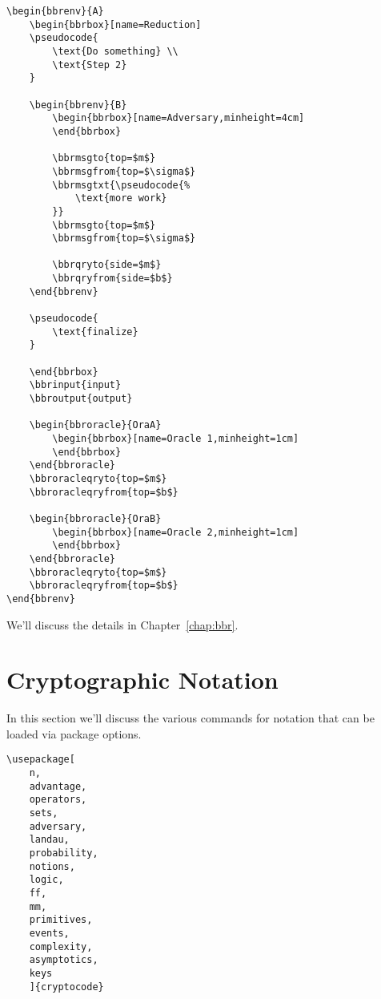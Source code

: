\documentclass[a4paper]{report}
\begin{document}
\begin{lstlisting}
\begin{bbrenv}{A}
	\begin{bbrbox}[name=Reduction]
	\pseudocode{
		\text{Do something} \\
		\text{Step 2}
	}

	\begin{bbrenv}{B}
		\begin{bbrbox}[name=Adversary,minheight=4cm]
		\end{bbrbox}

		\bbrmsgto{top=$m$}
		\bbrmsgfrom{top=$\sigma$}
		\bbrmsgtxt{\pseudocode{%
			\text{more work}
		}}
		\bbrmsgto{top=$m$}
		\bbrmsgfrom{top=$\sigma$}

		\bbrqryto{side=$m$}
		\bbrqryfrom{side=$b$}
	\end{bbrenv}

	\pseudocode{
		\text{finalize}
	}

	\end{bbrbox}
	\bbrinput{input}
	\bbroutput{output}

	\begin{bbroracle}{OraA}
		\begin{bbrbox}[name=Oracle 1,minheight=1cm]
		\end{bbrbox}
	\end{bbroracle}
	\bbroracleqryto{top=$m$}
	\bbroracleqryfrom{top=$b$}

	\begin{bbroracle}{OraB}
		\begin{bbrbox}[name=Oracle 2,minheight=1cm]
		\end{bbrbox}
	\end{bbroracle}
	\bbroracleqryto{top=$m$}
	\bbroracleqryfrom{top=$b$}
\end{bbrenv}
\end{lstlisting}
We'll discuss the details in Chapter~\ref{chap:bbr}.

\chapter{Cryptographic Notation}
\label{chap:commands}
In this section we'll discuss the various commands for notation that can be loaded via package options.
\begin{lstlisting}
\usepackage[
	n,
	advantage,
	operators,
	sets,
	adversary,
	landau,
	probability,
	notions,
	logic,
	ff,
	mm,
	primitives,
	events,
	complexity,
	asymptotics,
	keys
	]{cryptocode}
\end{lstlisting}
\end{document}
